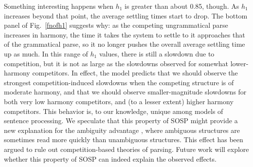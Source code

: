 \documentclass[10pt,letterpaper]{article}
\begin{document}
Something interesting happens when $h_1$ is greater than about 0.85, though. As $h_1$ increases beyond that point, the average settling times start to drop. The bottom panel of Fig.~\ref{fnofh1} suggests why: as the competing ungrammatical parse increases in harmony, the time it takes the system to settle to it approaches that of the grammatical parse, so it no longer pushes the overall average settling time up as much. In this range of $h_1$ values, there is still a slowdown due to competition, but it is not as large as the slowdowns observed for somewhat lower-harmony competitors. In effect, the model predicts that we should observe the strongest competition-induced slowdowns when the competing structure is of moderate harmony, and that we should observe smaller-magnitude slowdowns for both very low harmony competitors, and (to a lesser extent) higher harmony competitors. This behavior is, to our knowledge, unique among models of sentence processing. We speculate that this property of SOSP might provide a new explanation for the ambiguity advantage \cite[e.g.]{traxler1998adjunct}, where ambiguous structures are sometimes read more quickly than unambiguous structures. This effect has been argued to rule out competition-based theories of parsing. Future work will explore whether this property of SOSP can indeed explain the observed effects.
\end{document}

